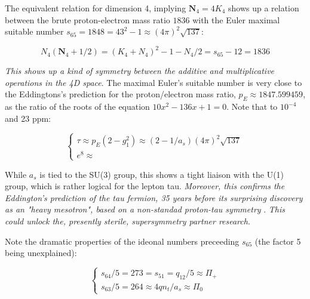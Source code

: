 \documentclass[a4paper,9pt]{article}
\begin{document}
The equivalent relation for dimension 4, implying $\textbf{N}_4 = 4 K_4$ shows up a relation between the brute proton-electron mass ratio $1836$ with the Euler maximal suitable number $s_{65} = 1848 = 43^2 -1 \approx (4\pi)^2\sqrt {137}$:

\begin{equation}\label{Eq27}
 N_4(\textbf{N}_4 + 1/2) = (K_4 + N_4)^2 - 1 - N_4/2 = s_{65} - 12 = 1836
 \end{equation}

\textit{This shows up a kind of symmetry between the additive and multiplicative operations in the 4D space}. The maximal Euler's suitable number is very close to the Eddingtons's prediction \cite{Eddington} for the proton/electron mass ratio, $p_E \approx 1847.599459$, as the ratio of the roots of the equation $10x^2 - 136 x + 1 = 0$. Note that to $10^{-4}$ and 23 ppm:

\begin{equation}\label{Eq26}
 \left\{
    \begin{array}{ll} 
           \tau \approx p_E(2-g_1^2) \approx (2-1/a_s)(4\pi)^2\sqrt {137}\\
            e^8 \approx  
    \end{array}
\right.
\end{equation}
 




 
While $a_s$ is tied to the SU(3) group, this shows a tight liaison with the U(1) group, which is rather logical for the lepton tau. \textit {Moreover, this confirms the Eddington's prediction of the tau fermion, 35 years before its surprising discovery as an "heavy mesotron", based on a non-standad proton-tau symmetry} \cite{Eddington}. \textit{This could unlock the, presently sterile, supersymmetry partner research}.

Note the dramatic properties of the ideonal numbers preceeding $s_{65}$ (the factor 5 being unexplained):

\begin{equation}\label{Eq26}
 \left\{
    \begin{array}{ll} 
           s_{64}/5 = 273 = s_{51} = q_{12}/5 \approx \Pi_+\\
            s_{63}/5 = 264 \approx 4qn_t/a_s \approx \Pi_0 
    \end{array}
\right.
\end{equation}
 
\end{document}
